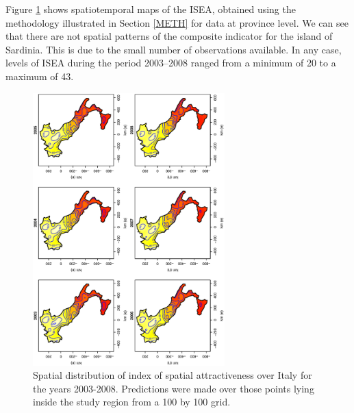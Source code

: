 \documentclass[10pt]{article}
\theoremstyle{definition}
\theoremstyle{plain}
\begin{document}
Figure \ref{fig5} shows spatiotemporal maps of the ISEA, obtained using the methodology illustrated in Section \ref{METH} for data at province level. We can see that there are not spatial patterns of the composite indicator for the island of Sardinia. This is due to the small number of observations available. In any case, levels of ISEA during the period 2003--2008 ranged from a minimum of 20 to a maximum of 43.


\begin{figure}[htbp]
	\centering
		\includegraphics[width=0.66\textwidth, angle=270]{index.eps}
	\caption{Spatial distribution of index of spatial attractiveness over Italy for the years 2003-2008. Predictions were made over those points lying inside the study region from a 100 by 100 grid.}
	\label{fig5}
\end{figure}
\end{document}
